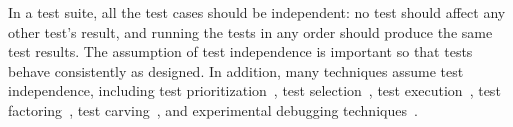 In a test suite, all the test cases should be independent:
no test should affect any other test's result, and
running the tests in any order should produce the same test results.
The assumption of test independence 
is important so that tests behave consistently
as designed. In addition, 
many techniques assume test independence, including test
prioritization~\cite{Elbaum:2000:PTC:347324.348910,
Rummel:2005:TPR:1066677.1067016, Srivastava:2002:EPT:566172.566187, Jiang:2009:ART},
test selection~\cite{harroldetal:OOPSLA:2001, Orso:2004:SRT,
Briand:2009:ART, Zhang:2012:RMT, Nanda:2011:RTP, hsu09may},
test execution~\cite{Kim:2013:OUT, Misailovic:2007},
test factoring~\cite{Saff:2005, Wu:2010:LRV}, test carving~\cite{Elbaum:2006},
and experimental debugging techniques~\cite{Zeller:2002,
Steimann:2013, Zhang:2013:IMF}.
